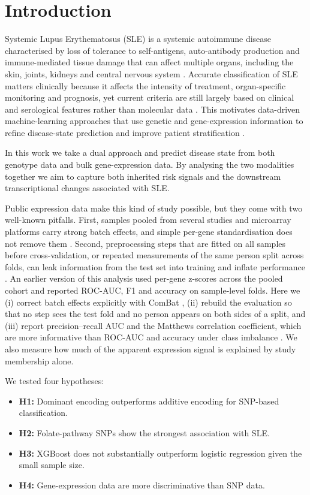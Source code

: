 \documentclass[11pt]{article}
\begin{document}
\section{Introduction}

Systemic Lupus Erythematosus (SLE) is a systemic autoimmune disease characterised by loss of tolerance to self-antigens, auto-antibody production and immune-mediated tissue damage that can affect multiple organs, including the skin, joints, kidneys and central nervous system \citep{tsokos2011}. Accurate classification of SLE matters clinically because it affects the intensity of treatment, organ-specific monitoring and prognosis, yet current criteria are still largely based on clinical and serological features rather than molecular data \citep{aringer2019}. This motivates data-driven machine-learning approaches that use genetic and gene-expression information to refine disease-state prediction and improve patient stratification \citep{figgett2019}.

In this work we take a dual approach and predict disease state from both genotype data and bulk gene-expression data. By analysing the two modalities together we aim to capture both inherited risk signals and the downstream transcriptional changes associated with SLE.

Public expression data make this kind of study possible, but they come with two well-known pitfalls. First, samples pooled from several studies and microarray platforms carry strong batch effects, and simple per-gene standardisation does not remove them \citep{chen2011}. Second, preprocessing steps that are fitted on all samples before cross-validation, or repeated measurements of the same person split across folds, can leak information from the test set into training and inflate performance \citep{kapoor2023}. An earlier version of this analysis used per-gene z-scores across the pooled cohort and reported ROC-AUC, F1 and accuracy on sample-level folds. Here we (i) correct batch effects explicitly with ComBat \citep{johnson2007}, (ii) rebuild the evaluation so that no step sees the test fold and no person appears on both sides of a split, and (iii) report precision--recall AUC and the Matthews correlation coefficient, which are more informative than ROC-AUC and accuracy under class imbalance \citep{saito2015,chicco2020}. We also measure how much of the apparent expression signal is explained by study membership alone.

We tested four hypotheses:
\begin{itemize}
  \item \textbf{H1:} Dominant encoding outperforms additive encoding for SNP-based classification.
  \item \textbf{H2:} Folate-pathway SNPs show the strongest association with SLE.
  \item \textbf{H3:} XGBoost does not substantially outperform logistic regression given the small sample size.
  \item \textbf{H4:} Gene-expression data are more discriminative than SNP data.
\end{itemize}
\end{document}
